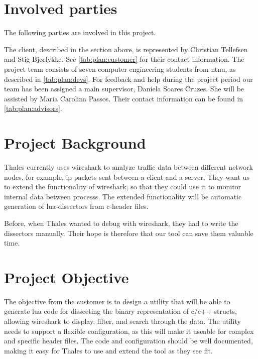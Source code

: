 \section{Involved parties}
The following parties are involved in this project.

The client, described in the section above, is represented by Christian Tellefsen and Stig Bjørlykke. See \autoref{tab:plan:customer} for their contact information.
The project team consists of seven computer engineering students from \Gls{ntnu}, as described in \autoref{tab:plan:devs}.
For feedback and help during the project period our team has been assigned a main supervisor, Daniela Soares Cruzes.
She will be assisted by Maria Carolina Passos. Their contact information can be found in \autoref{tab:plan:advisors}.

\section{Project Background}
Thales currently uses \Gls{wireshark} to analyze traffic data between different network nodes, for example, \Gls{ip} \glspl{packet} sent between a client and a server.
They want us to extend the functionality of \Gls{wireshark}, so that they could use it to monitor internal data between \glspl{process}. The extended functionality will be automatic generation of \Gls{lua}-\glspl{dissector} from \Gls{c}-\gls{header} files.

Before, when Thales wanted to debug with \Gls{wireshark}, they had to write the \glspl{dissector} manually. Their hope is therefore that our tool can save them valuable time.

\section{Project Objective}
The objective from the customer is to design a \gls{utility} that will be able to generate \Gls{lua} code for dissecting the \gls{binary} representation of \Gls{c}/\Gls{c++} \glspl{struct}, allowing \Gls{wireshark} to display, filter, and search through the data.
 The \gls{utility} needs to support a flexible configuration, as this will make it useable for complex and specific \gls{header} files. 
The code and configuration should be well documented, making it easy for Thales to use and extend the tool as they see fit.

